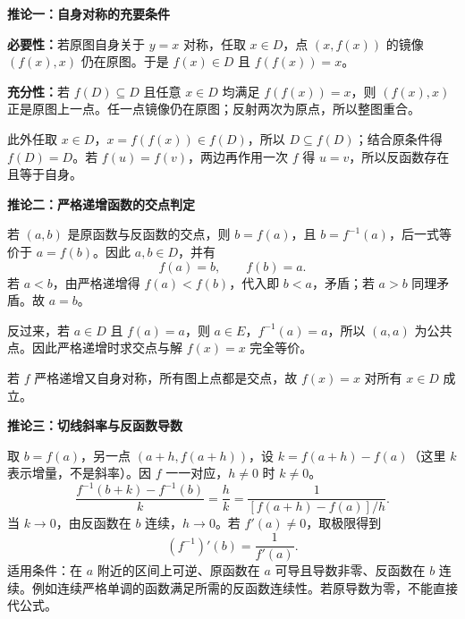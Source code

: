 \clearpage
\begin{proofbox}
\textbf{\textcolor{CProof}{推论一：自身对称的充要条件}}


\textbf{必要性：}若原图自身关于 $y=x$ 对称，任取 $x\in D$，点 $(x,f(x))$ 的镜像 $(f(x),x)$ 仍在原图。于是 $f(x)\in D$ 且 $f(f(x))=x$。

\textbf{充分性：}若 $f(D)\subseteq D$ 且任意 $x\in D$ 均满足 $f(f(x))=x$，则 $(f(x),x)$ 正是原图上一点。任一点镜像仍在原图；反射两次为原点，所以整图重合。

此外任取 $x\in D$，$x=f(f(x))\in f(D)$，所以 $D\subseteq f(D)$；结合原条件得 $f(D)=D$。若 $f(u)=f(v)$，两边再作用一次 $f$ 得 $u=v$，所以反函数存在且等于自身。
\end{proofbox}
\clearpage
\begin{proofbox}
\textbf{\textcolor{CProof}{推论二：严格递增函数的交点判定}}


若 $(a,b)$ 是原函数与反函数的交点，则 $b=f(a)$，且 $b=f^{-1}(a)$，后一式等价于 $a=f(b)$。因此 $a,b\in D$，并有
\[
 f(a)=b,\qquad f(b)=a.
\]
若 $a<b$，由严格递增得 $f(a)<f(b)$，代入即 $b<a$，矛盾；若 $a>b$ 同理矛盾。故 $a=b$。

反过来，若 $a\in D$ 且 $f(a)=a$，则 $a\in E$，$f^{-1}(a)=a$，所以 $(a,a)$ 为公共点。因此严格递增时求交点与解 $f(x)=x$ 完全等价。

若 $f$ 严格递增又自身对称，所有图上点都是交点，故 $f(x)=x$ 对所有 $x\in D$ 成立。
\end{proofbox}
\clearpage
\begin{proofbox}
\textbf{\textcolor{CProof}{推论三：切线斜率与反函数导数}}


取 $b=f(a)$，另一点 $(a+h,f(a+h))$，设 $k=f(a+h)-f(a)$（这里 $k$ 表示增量，不是斜率）。因 $f$ 一一对应，$h\ne0$ 时 $k\ne0$。
\[
\frac{f^{-1}(b+k)-f^{-1}(b)}{k}
=\frac{h}{k}=\frac{1}{[f(a+h)-f(a)]/h}.
\]
当 $k\to0$，由反函数在 $b$ 连续，$h\to0$。若 $f'(a)\ne0$，取极限得到
\[
\boxed{(f^{-1})'(b)=\frac1{f'(a)}}.
\]
适用条件：在 $a$ 附近的区间上可逆、原函数在 $a$ 可导且导数非零、反函数在 $b$ 连续。例如连续严格单调的函数满足所需的反函数连续性。若原导数为零，不能直接代公式。
\end{proofbox}
